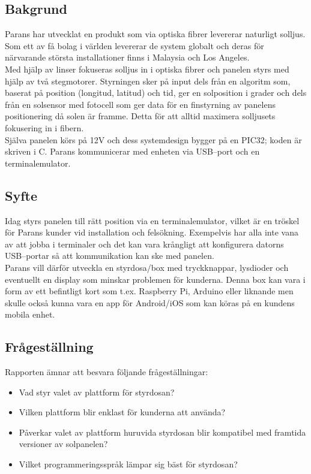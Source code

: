 \documentclass{article}
\begin{document}
        \subsection{Bakgrund} %
        \label{sub:bakgrund}
            Parans har utvecklat en produkt som via optiska fibrer levererar naturligt solljus. Som ett av få bolag i världen levererar de system globalt och deras för närvarande största installationer finns i Malaysia och Los Angeles.\\

            \noindent Med hjälp av linser fokuseras solljus in i optiska fibrer och panelen styrs med hjälp av två stegmotorer. Styrningen sker på input dels från en algoritm som, baserat på position (longitud, latitud) och tid, ger en solposition i grader och dels från en solsensor med fotocell som ger data för en finstyrning av panelens positionering då solen är framme. Detta för att alltid maximera solljusets fokusering in i fibern.\\

            \noindent Själva panelen körs på 12V och dess systemdesign bygger på en PIC32; koden är skriven i C. Parans kommunicerar med enheten via USB--port och en terminalemulator. 
        
        \subsection{Syfte} %
        \label{sub:syfte}
            Idag styrs panelen till rätt position via en terminalemulator, vilket är en tröskel för Parans kunder vid installation och felsökning.  Exempelvis har alla inte vana av att jobba i terminaler och det kan vara krångligt att konfigurera datorns USB--portar så att kommunikation kan ske med panelen. \\

            \noindent Parans vill därför utveckla en styrdosa/box med tryckknappar, lysdioder och eventuellt en display som minskar problemen för kunderna. Denna box kan vara i form av ett befintligt kort som t.ex. Raspberry Pi, Arduino eller liknande men skulle också kunna vara en app för Android/iOS som kan köras på en kundens mobila enhet.

        \subsection{Frågeställning} %
        \label{sub:fragestallning}
        Rapporten ämnar att besvara följande frågeställningar:\\
        \begin{itemize}
            \item Vad styr valet av plattform för styrdosan?
            \item Vilken plattform blir enklast för kunderna att använda?
            \item Påverkar valet av plattform huruvida styrdosan blir kompatibel med framtida versioner av solpanelen?
            \item Vilket programmeringsspråk lämpar sig bäst för styrdosan?
        \end{itemize}   
        
\end{document}
